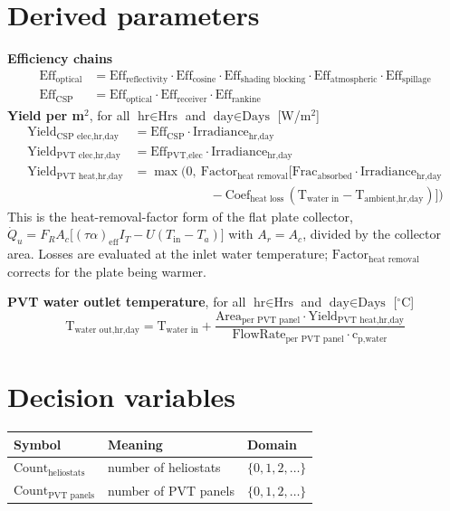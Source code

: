 \documentclass[11pt,a4paper]{article}
\newcommand{\T}[1]{\text{#1}}
\begin{document}
\section{Derived parameters}
\textbf{Efficiency chains}
\begin{align*}
\T{Eff}_{\T{optical}} &= \T{Eff}_{\T{reflectivity}}\cdot\T{Eff}_{\T{cosine}}\cdot\T{Eff}_{\T{shading blocking}}\cdot\T{Eff}_{\T{atmospheric}}\cdot\T{Eff}_{\T{spillage}}\\
\T{Eff}_{\T{CSP}} &= \T{Eff}_{\T{optical}}\cdot\T{Eff}_{\T{receiver}}\cdot\T{Eff}_{\T{rankine}}
\end{align*}
\textbf{Yield per m$^2$}, for all $\T{hr}\in\T{Hrs}$ and $\T{day}\in\T{Days}$ [W/m$^2$]
\begin{align*}
\T{Yield}_{\T{CSP elec,hr,day}} &= \T{Eff}_{\T{CSP}}\cdot\T{Irradiance}_{\T{hr,day}}\\
\T{Yield}_{\T{PVT elec,hr,day}} &= \T{Eff}_{\T{PVT,elec}}\cdot\T{Irradiance}_{\T{hr,day}}\\
\T{Yield}_{\T{PVT heat,hr,day}} &= \max\Big(0,\ \T{Factor}_{\T{heat removal}}\big[\T{Frac}_{\T{absorbed}}\cdot\T{Irradiance}_{\T{hr,day}}\\
&\hspace{6em}-\T{Coef}_{\T{heat loss}}\,(\T{T}_{\T{water in}}-\T{T}_{\T{ambient,hr,day}})\big]\Big)
\end{align*}
This is the heat-removal-factor form of the flat plate collector,
$\dot{Q}_u = F_R A_c\big[(\tau\alpha)_{\T{eff}} I_T - U(T_{\T{in}}-T_a)\big]$ with $A_r=A_c$,
divided by the collector area. Losses are evaluated at the inlet water temperature;
$\T{Factor}_{\T{heat removal}}$ corrects for the plate being warmer.

\textbf{PVT water outlet temperature}, for all $\T{hr}\in\T{Hrs}$ and $\T{day}\in\T{Days}$ [$^\circ$C]
\[
\T{T}_{\T{water out,hr,day}} = \T{T}_{\T{water in}} + \frac{\T{Area}_{\T{per PVT panel}}\cdot\T{Yield}_{\T{PVT heat,hr,day}}}{\T{FlowRate}_{\T{per PVT panel}}\cdot\T{c}_{\T{p,water}}}
\]

\section{Decision variables}
\begin{tabular}{@{}lll@{}}
\toprule
Symbol & Meaning & Domain\\\midrule
$\T{Count}_{\T{heliostats}}$ & number of heliostats & $\{0,1,2,\dots\}$\\
$\T{Count}_{\T{PVT panels}}$ & number of PVT panels & $\{0,1,2,\dots\}$\\
\bottomrule
\end{tabular}
\end{document}
